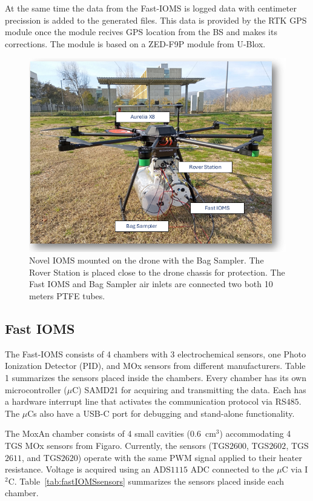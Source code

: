 \documentclass[lettersize,journal]{IEEEtran}
\begin{document}
At the same time the data from the Fast-IOMS is logged data with centimeter precission is added to the generated files. This data is provided by the RTK GPS module once the module recives GPS location from the BS and makes its corrections. The module is based on a ZED-F9P module from U-Blox.

\begin{figure}[!t] %
	\centering
	\includegraphics[width=1\linewidth]{./images/fig3.png}
	\hfill
	\caption{Novel IOMS mounted on the drone with the Bag Sampler. The Rover Station is placed close to the drone chassis for protection. The Fast IOMS and Bag Sampler air inlets are connected two both 10 meters PTFE tubes.}
	\label{fig:iomsPhoto}
\end{figure}

\subsection{Fast IOMS}
\label{ssec:fastIOMS}
The Fast-IOMS consists of 4 chambers with 3 electrochemical sensors, one Photo Ionization Detector (PID), and MOx sensors from different manufacturers. Table 1 summarizes the sensors placed inside the chambers.
Every chamber has its own microcontroller ($\mu$C) SAMD21 for acquiring and transmitting the data. Each has a hardware interrupt line that activates the communication protocol via RS$485$. The $\mu$Cs also have a USB-C port for debugging and stand-alone functionality.

The MoxAn chamber consists of 4 small cavities ($0.6$~cm$^{3}$) accommodating 4 TGS MOx sensors from Figaro. Currently, the sensors (TGS$2600$, TGS$2602$, TGS$2611$, and TGS$2620$) operate with the same PWM signal applied to their heater resistance. Voltage is acquired using an ADS$1115$ ADC connected to the $\mu$C via I$^{2}$C. Table~\ref{tab:fastIOMSsensors} summarizes the sensors placed inside each chamber.
\end{document}
